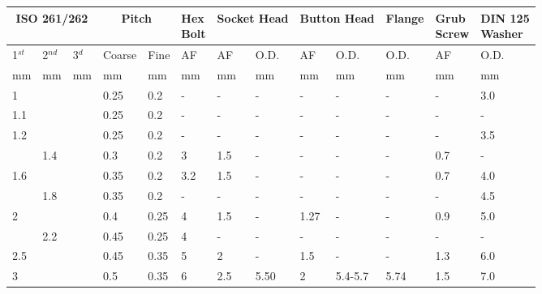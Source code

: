 \begin{table}[h!]
    \footnotesize
\begin{longtable}{lll|ll|lllllll|l}
	\multicolumn{3}{c}{ISO 261/262}
    &\multicolumn{2}{c}{Pitch}
    &\specialcell{Hex\\Bolt}
    &\multicolumn{2}{c}{Socket Head}
    &\multicolumn{2}{c}{Button Head}
    &Flange
    &\specialcell{Grub\\Screw}
    &\specialcell{DIN 125\\Washer}
    \\
\hline
    1$^{st}$
    &2$^{nd}$
    &3$^{d}$
    &Coarse
    &Fine
    & AF %
    & AF %
    & O.D.
    & AF %
    & O.D.
    & O.D. %
    & AF %
    & O.D. %
    \\
\hline
	mm
    &mm
    &mm
    &mm
    &mm
    &mm
    &mm
    &mm
    &mm
    &mm
    &mm
    &mm
    &mm
    \\
\hline
    1   &    &    &0.25    &0.2        &-         &-      &-      &-      &-           &-         &-    &3.0   \\
    1.1 &    &    &0.25    &0.2        &-         &-      &-      &-      &-           &-         &-    &-     \\
    1.2 &    &    &0.25    &0.2        &-         &-      &-      &-      &-           &-         &-    &3.5   \\
        &1.4 &    &0.3     &0.2        &3         &1.5    &-      &-      &-           &-         &0.7  &-     \\
    1.6 &    &    &0.35    &0.2        &3.2       &1.5    &-      &-      &-           &-         &0.7  &4.0   \\
        &1.8 &    &0.35    &0.2        &-         &-      &-      &-      &-           &-         &-    &4.5   \\
    2   &    &    &0.4     &0.25       &4         &1.5    &-      &1.27   &-           &-         &0.9  &5.0   \\
        &2.2 &    &0.45    &0.25       &4         &-      &-      &-      &-           &-         &-    &-     \\
    2.5 &    &    &0.45    &0.35       &5         &2      &-      &1.5    &-           &-         &1.3  &6.0   \\
    3   &    &    &0.5     &0.35       &6         &2.5    &5.50   &2      &5.4-5.7     &5.74      &1.5  &7.0   \\

\end{longtable}
\end{table}
